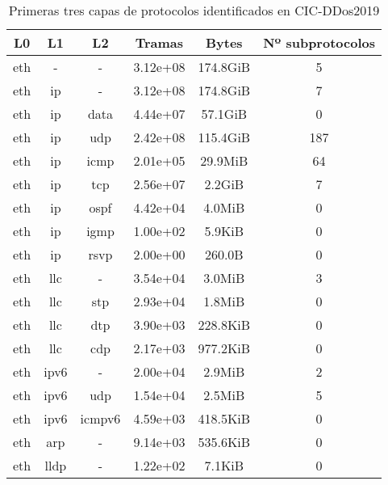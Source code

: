 \begin{table}[H]
    \begin{center}
        \begin{tabular}{|c c c | c c c|} 
            \hline
            \textbf{L0} & \textbf{L1} & \textbf{L2} & \textbf{Tramas} & \textbf{Bytes} & \textbf{Nº subprotocolos}\\
            \hline\hline
eth &- &- & 3.12e+08 & 174.8GiB & 5 \\
eth &ip &- & 3.12e+08 & 174.8GiB & 7 \\
eth &ip &data & 4.44e+07 & 57.1GiB & 0 \\
eth &ip &udp & 2.42e+08 & 115.4GiB & 187 \\
eth &ip &icmp & 2.01e+05 & 29.9MiB & 64 \\
eth &ip &tcp & 2.56e+07 & 2.2GiB & 7 \\
eth &ip &ospf & 4.42e+04 & 4.0MiB & 0 \\
eth &ip &igmp & 1.00e+02 & 5.9KiB & 0 \\
eth &ip &rsvp & 2.00e+00 & 260.0B & 0 \\
eth &llc &- & 3.54e+04 & 3.0MiB & 3 \\
eth &llc &stp & 2.93e+04 & 1.8MiB & 0 \\
eth &llc &dtp & 3.90e+03 & 228.8KiB & 0 \\
eth &llc &cdp & 2.17e+03 & 977.2KiB & 0 \\
eth &ipv6 &- & 2.00e+04 & 2.9MiB & 2 \\
eth &ipv6 &udp & 1.54e+04 & 2.5MiB & 5 \\
eth &ipv6 &icmpv6 & 4.59e+03 & 418.5KiB & 0 \\
eth &arp &- & 9.14e+03 & 535.6KiB & 0 \\
eth &lldp &- & 1.22e+02 & 7.1KiB & 0 \\
            \hline
        \end{tabular}
    \end{center}
    \caption{Primeras tres capas de protocolos identificados en CIC-DDos2019}
    \label{table:cicddos2019protocols}
\end{table}
